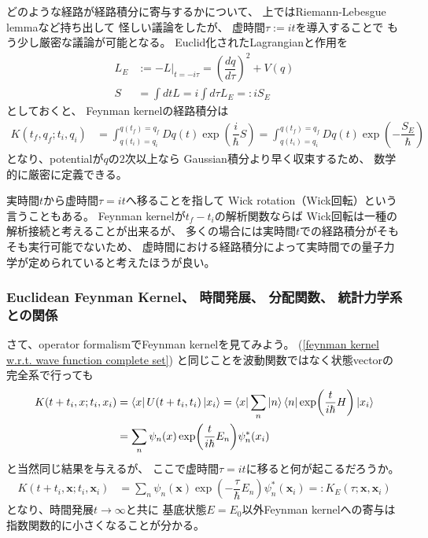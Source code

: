 どのような経路が経路積分に寄与するかについて、
上ではRiemann-Lebesgue lemmaなど持ち出して
怪しい議論をしたが、
虚時間$\tau := i t$を導入することで
もう少し厳密な議論が可能となる。
Euclid化されたLagrangianと作用を
\begin{subequations}
\begin{align}
    L_E
    &:=
    - L \Big|_{t = - i \tau}
    =
    \left(
        \dfrac{ d q }{ d \tau }
    \right)^2
    +
    V(q)
\\
    S
    &=
    \int dt L
    =
    i \int d\tau L_E
    =: i S_E
\end{align}
\end{subequations}
としておくと、
Feynman kernelの経路積分は
\begin{align}
    K( t_f, q_f ; t_i, q_i )
    &=
    \int_{q(t_i) = q_i}^{q(t_f) = q_f}
        Dq(t)
    \exp\left(
        \dfrac{i}{\hbar} S
    \right)
=
    \int_{q(t_i) = q_i}^{q(t_f) = q_f}
        Dq(t)
    \exp\left(
        -
        \dfrac{ S_E }{\hbar}
    \right)
\end{align}
となり、potentialが$q$の$2$次以上なら
Gaussian積分より早く収束するため、
数学的に厳密に定義できる。

実時間$t$から虚時間$\tau = i t$へ移ることを指して
Wick rotation（Wick回転）という言うこともある。
Feynman kernelが$t_f - t_i$の解析関数ならば
Wick回転は一種の解析接続と考えることが出来るが、
多くの場合には実時間$t$での経路積分がそもそも実行可能でないため、
虚時間における経路積分によって実時間での量子力学が定められていると考えたほうが良い。

\subsubsection{
    Euclidean Feynman Kernel、
    時間発展、
    分配関数、
    統計力学系との関係
}

さて、operator formalismでFeynman kernelを見てみよう。
(\ref{feynman kernel w.r.t. wave function complete set})
と同じことを波動関数ではなく状態vectorの完全系で行っても
\begin{align}
    K(t + t_i, x; t_i, x_i)
    &=
    \bra{ x }
        U (t + t_i, t_i)
    \ket{ x_i }
    =
    \bra{ x }
        \sum_n
            \ket{n}
            \bra{n}
        \exp(
            \dfrac{ t }{ i \hbar }
            H
        )
    \ket{ x_i }
\notag\\&
    =
    \sum_n
    \psi_n( x )
        \exp(
            \dfrac{ t }{ i \hbar }
            E_n
        )
    \psi_n^*( x_i )
\end{align}
と当然同じ結果を与えるが、
ここで虚時間$\tau = i t$に移ると何が起こるだろうか。
\begin{align}
    K(t + t_i, \bm{x}; t_i, \bm{x}_i)
    &=
    \sum_n
    \psi_n( \bm{x} )
        \exp(
            -
            \dfrac{ \tau }{ \hbar }
            E_n
        )
    \psi_n^*( \bm{x}_i )
    =:
    K_E ( \tau; \bm{x}, \bm{x}_i )
\end{align}
となり、時間発展$t \to \infty$と共に
基底状態$ E = E_0 $以外Feynman kernelへの寄与は
指数関数的に小さくなることが分かる。

